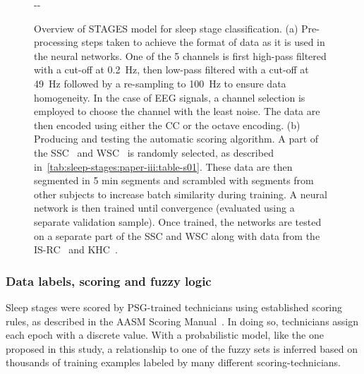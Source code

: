 \begin{figure}[t]
\begin{adjustwidth*}{}{-\marginparwidth-\marginparsep}
    \myfloatalign   
      \\
    \caption[\acs{STAGES} model for sleep staging]{Overview of \ac{STAGES} model for sleep stage classification. (a) Pre-processing steps taken to achieve the format of data as it is used in the neural networks. One of the 5 channels is first high-pass filtered with a cut-off at \SI{0.2}{\hertz}, then low-pass filtered with a cut-off at \SI{49}{\hertz} followed by a re-sampling to \SI{100}{\hertz} to ensure data homogeneity. In the case of \ac{EEG} signals, a channel selection is employed to choose the channel with the least noise. The data are then encoded using either the \ac{CC} or the octave encoding. (b) Producing and testing the automatic scoring algorithm. A part of the \ac{SSC}~\cite{Andlauer2013,Moore2014} and \ac{WSC}~\cite{Moore2014, Young2009} is randomly selected, as described in~\cref{tab:sleep-stages:paper-iii:table-s01}. These data are then segmented in 5 min segments and scrambled with segments from other subjects to increase batch similarity during training. A neural network is then trained until convergence (evaluated using a separate validation sample). Once trained, the networks are tested on a separate part of the \ac{SSC} and \ac{WSC} along with data from the \ac{IS-RC}~\cite{Kuna2013} and \ac{KHC}~\cite{Andlauer2013, Hong2006}.}
    \label{fig:sleep-stages:paper-iii:figure-05}
\end{adjustwidth*}
\end{figure}

\subsubsection{Data labels, scoring and fuzzy logic}
Sleep stages were scored by \ac{PSG}-trained technicians using established scoring rules, as described in the \ac{AASM} Scoring Manual~\cite{Berry2017}.
In doing so, technicians assign each epoch with a discrete value.
With a probabilistic model, like the one proposed in this study, a relationship to one of the fuzzy sets is inferred based on thousands of training examples labeled by many different scoring-technicians. 

